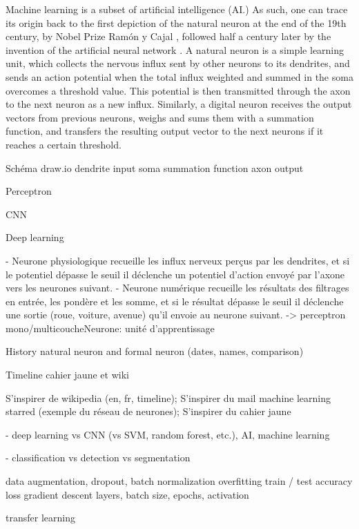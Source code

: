 Machine learning is a subset of artificial intelligence (AI.) As such, one can trace its origin back to the first depiction of the natural neuron at the end of the 19th century, by Nobel Prize Ramón y Cajal \cite{Lopez2006}, followed half a century later by the invention of the artificial neural network \cite{Mcculloch1943}. A natural neuron is a simple learning unit, which collects the nervous influx sent by other neurons to its dendrites, and sends an action potential when the total influx weighted and summed in the soma overcomes a threshold value. This potential is then transmitted through the axon to the next neuron as a new influx. Similarly, a digital neuron receives the output vectors from previous neurons, weighs and sums them with a summation function, and transfers the resulting output vector to the next neurons if it reaches a certain threshold.

Schéma draw.io
dendrite input
soma summation function
axon output

Perceptron \cite{Rosenblatt1958}

CNN

Deep learning

- Neurone physiologique recueille les influx nerveux perçus par les dendrites, et si le potentiel dépasse le seuil il déclenche un potentiel d'action envoyé par l'axone vers les neurones suivant.
- Neurone numérique recueille les résultats des filtrages en entrée, les pondère et les somme, et si le résultat dépasse le seuil il déclenche une sortie (roue, voiture, avenue) qu'il envoie au neurone suivant. -> perceptron mono/multicoucheNeurone: unité d'apprentissage



History natural neuron and formal neuron (dates, names, comparison)

Timeline cahier jaune et wiki

S'inspirer de wikipedia (en, fr, timeline); 
S'inspirer du mail machine learning starred (exemple du réseau de neurones); 
S'inspirer du cahier jaune


- deep learning vs CNN (vs SVM, random forest, etc.), AI, machine learning

- classification vs detection vs segmentation

data augmentation, dropout, batch normalization
overfitting
train / test
accuracy loss
gradient descent
layers, batch size, epochs, activation

transfer learning



